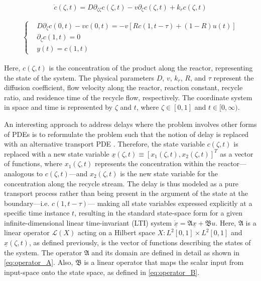 \begin{equation} \label{eq:PDE_original_model}
    \dot{c}(\zeta, t) = D \partial_{\zeta \zeta} c(\zeta, t) - v \partial_\zeta c(\zeta, t) + k_r c(\zeta, t)
\end{equation}

\begin{align} \label{eq:BC}
    \begin{cases}
        &D \partial_\zeta c(0, t) - v c(0, t) = -v \left[ R c(1, t-\tau) + (1-R) u(t) \right] \\
        &\partial_\zeta c(1, t) = 0 \\
        &y(t) = c(1, t)
    \end{cases}
\end{align}

Here, $c(\zeta, t)$ is the concentration of the product along the reactor, representing the state of the system. The physical parameters $D$, $v$, $k_r$, $R$, and $\tau$ represent the diffusion coefficient, flow velocity along the reactor, reaction constant, recycle ratio, and residence time of the recycle flow, respectively. The coordinate system in space and time is represented by $\zeta$ and $t$, where $\zeta \in [0, 1]$ and $t \in [0, \infty)$.

An interesting approach to address delays where the problem involves other forms of PDEs is to reformulate the problem such that the notion of delay is replaced with an alternative transport PDE \cite{krstic2009book}. 
Therefore, the state variable $c(\zeta,t)$ is replaced with a new state variable $\underline{x}(\zeta, t) \equiv [x_1(\zeta, t), x_2(\zeta, t)]^T$ as a vector of functions, where $x_1(\zeta, t)$ represents the concentration within the reactor—analogous to $c(\zeta,t)$—and $x_2(\zeta, t)$ is the new state variable for the concentration along the recycle stream. The delay is thus modeled as a pure transport process rather than being present in the argument of the state at the boundary—i.e. $c(1,t-\tau)$— making all state variables expressed explicitly at a specific time instance $t$, resulting in the standard state-space form for a given infinite-dimensional linear time-invariant (LTI) system $\dot{\underline{x}} = \mathfrak{A} \underline{x} + \mathfrak{B} u$. Here, $\mathfrak{A}$ is a linear operator $\mathcal{L}(X)$ acting on a Hilbert space $X: L^2[0,1] \times L^2[0,1]$ and $\underline{x}(\zeta,t)$, as defined previously, is the vector of functions describing the states of the system. The operator $\mathfrak{A}$ and its domain are defined in detail as shown in \eqref{eq:operator_A}. Also, $\mathfrak{B}$ is a linear operator that maps the scalar input from input-space onto the state space, as defined in \eqref{eq:operator_B}.

